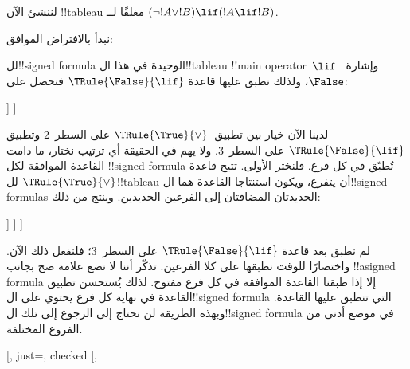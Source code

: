 \documentclass[../../../include/open-logic-section]{subfiles}
\begin{document}
\begin{ex}
لننشئ الآن !!{tableau} مغلقًا لــ $(\lnot !A \lor !B) \lif (!A
\lif !B)$.

نبدأ بالافتراض الموافق:
\begin{oltableau}
  [\sFmla{\False}{(\lnot \formula{A} \lor \formula{B}) \lif
      (\formula{A} \lif \formula{B})}, just=\TAss]
\end{oltableau}
لل!!{signed formula} الوحيدة في هذا ال!!{tableau} !!{main operator}~$\lif$
وإشارة~$\False$، ولذلك نطبق عليها قاعدة $\TRule{\False}{\lif}$
فنحصل على:
\begin{oltableau}
  [\sFmla{\False}{(\lnot \formula{A} \lor \formula{B})
      \lif (\formula{A} \lif \formula{B})}, just=\TAss, checked
    [\sFmla{\True}{\lnot \formula{A} \lor \formula{B}},
      just={\TRule{\False}{\lif}[1]}
      [\sFmla{\False}{(\formula{A} \lif \formula{B})},
        just={\TRule{\False}{\lif}[1]}
      ]
    ]
  ]
\end{oltableau}
لدينا الآن خيار بين تطبيق~$\TRule{\True}{\lor}$ على السطر~$2$ وتطبيق
$\TRule{\False}{\lif}$ على السطر~$3$. ولا يهم في الحقيقة أي ترتيب نختار،
ما دامت القاعدة الموافقة لكل !!{signed formula} تُطبّق في كل فرع. فلنختر
الأولى. تتيح قاعدة $\TRule{\True}{\lor}$ لل!!{tableau} أن يتفرع، ويكون
استنتاجا القاعدة هما ال!!{signed formula}s الجديدتان المضافتان إلى الفرعين
الجديدين. وينتج من ذلك:
\begin{oltableau}
  [\sFmla{\False}{(\lnot \formula{A} \lor \formula{B}) \lif
      (\formula{A} \lif \formula{B})}, just=\TAss, checked
    [\sFmla{\True}{\lnot \formula{A} \lor \formula{B}},
      just={\TRule{\False}{\lif}[1]}, checked
      [\sFmla{\False}{(\formula{A} \lif \formula{B})},
        just={\TRule{\False}{\lif}[1]}
        [\sFmla{\True}{\lnot \formula{A}}, just={\TRule{\True}{\lor}[2]}]
        [\sFmla{\True}{\formula{B}}, just={\TRule{\True}{\lor}[2]}]
      ]
    ]
  ]
\end{oltableau}
لم نطبق بعد قاعدة $\TRule{\False}{\lif}$ على السطر~$3$؛ فلنفعل ذلك الآن.
واختصارًا للوقت نطبقها على كلا الفرعين. تذكّر أننا لا نضع علامة صح بجانب
!!a{signed formula} إلا إذا طبقنا القاعدة الموافقة في كل فرع مفتوح. لذلك
يُستحسن تطبيق القاعدة في نهاية كل فرع يحتوي على ال!!{signed formula} التي
تنطبق عليها القاعدة. وبهذه الطريقة لن نحتاج إلى الرجوع إلى تلك
ال!!{signed formula} في موضع أدنى من الفروع المختلفة.
\begin{oltableau}
  [, just=\TAss, checked
    [,

\end{oltableau}
\end{ex}
\end{document}
